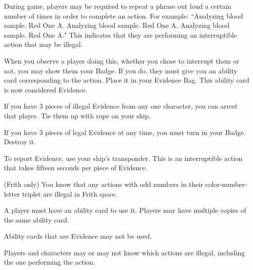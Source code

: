 \documentclass[green]{guildcamp4}
\begin{document}
\name{\gEvidence{}}


During game, players may be required to repeat a phrase out loud a certain number of times in order to complete an action. For example: ``Analyzing blood sample. Red One A. Analyzing blood sample. Red One A. Analyzing blood sample. Red One A." This indicates that they are performing an interruptible action that may be illegal. 

When you observe a player doing this, whether you chose to interrupt them or not, you may show them your Badge. If you do, they must give you an ability card corresponding to the action. Place it in your Evidence Bag. This ability card is now considered Evidence. 

If you have 3 pieces of illegal Evidence from any one character, you can arrest that player. Tie them up with rope on your ship.

If you have 3 pieces of legal Evidence at any time, you must turn in your Badge. Destroy it.

To report Evidence, use your ship's transponder. This is an interruptible action that takes fifteen seconds per piece of Evidence.

(Frith only) You know that any actions with odd numbers in their color-number-letter triplet are illegal in Frith space.

\begin{enum}[Notes]
  \item A player must have an ability card to use it. Players may have multiple copies of the same ability card.
  \item Ability cards that are Evidence may not be used.
  \item Players and characters may or may not know which actions are illegal, including the one performing the action.
\end{enum}
\end{document}
